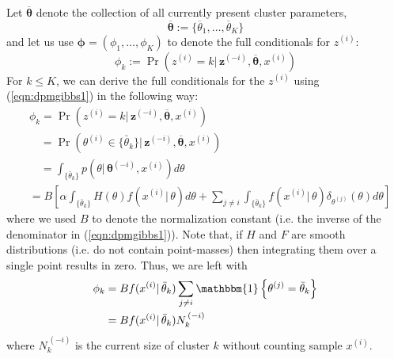 \documentclass[final,3p,times,twocolumn]{elsarticle}
\let\bs\boldsymbol
\let\ol\overline
\begin{document}
Let $\ol{\bs \theta}$ denote the collection of all currently present cluster parameters,
\begin{equation*}
\bs{\overline\theta}:=\{\overline \theta_1,\dots,\overline \theta_K\}
\end{equation*}
and let us use $\bs\phi = (\phi_1,\dots,\phi_K)$ to denote the full conditionals for $z^{(i)}$:
\begin{equation*}
\phi_k := \Pr(z^{(i)} = k|\,\bs z^{(-i)}, \ol{\bs\theta}, x^{(i)})
\end{equation*}
For $k\leq K$, we can derive the full conditionals for the $z^{(i)}$ using (\ref{eqn:dpmgibbs1}) in the following way:
\begin{equation*}
\begin{split}
&\phi_k = \Pr(z^{(i)} = k|\,\bs z^{(-i)}, \ol{\bs\theta}, x^{(i)})\\
&\quad= \Pr(\theta^{(i)} \in \{\bar \theta_k\}|\,\bs z^{(-i)},\overline {\bs \theta},x^{(i)})\\
&\quad= \int_{\{\bar \theta_k\}} p(\theta|\,\bs\theta^{(-i)},x^{(i)}) d\theta\\
&= B \left[\alpha\int_{\{\bar \theta_k\}} H(\theta)f(x^{(i)}|\,\theta)d\theta + \sum_{j\neq i}\int_{\{\bar \theta_k\}}f(x^{(i)}|\,\theta)\delta_{\theta^{(j)}}(\theta)d\theta\right]
\end{split}
\end{equation*}
where we used $B$ to denote the normalization constant (i.e. the inverse of the denominator in (\ref{eqn:dpmgibbs1})).
Note that, if $H$ and $F$ are smooth distributions (i.e. do not contain point-masses) then integrating them over a single point results in zero.
Thus, we are left with
\begin{equation}
\label{eqn:phi_k}
\begin{split}
\phi_k &= B f(x^{(i)}|\,\bar\theta_k)\sum_{j\neq i}\mathbbm{1}\left\{\theta^{(j)} = \bar \theta_k\right\} \\
&= B f(x^{(i)}|\,\bar\theta_k)N_k^{\,(-i)}\\
\end{split}
\end{equation}
where $N_k^{\,(-i)}$ is the current size of cluster $k$ without counting sample $x^{(i)}$.
\end{document}
